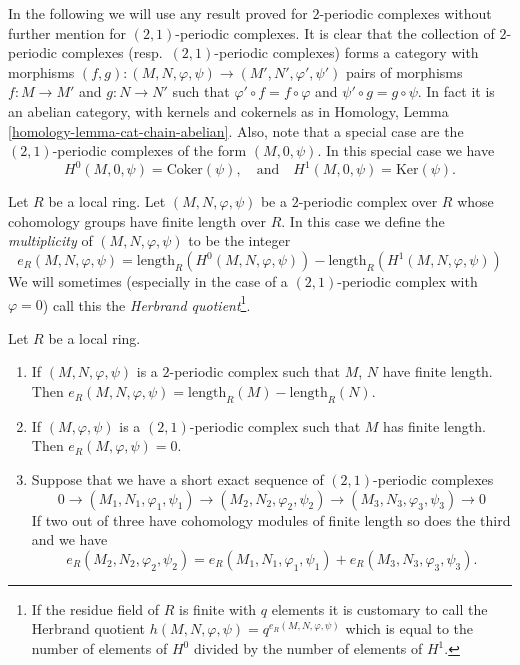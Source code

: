 \noindent
In the following we will use any result proved for $2$-periodic
complexes without further mention for $(2, 1)$-periodic complexes.
It is clear that the collection of $2$-periodic complexes
(resp.\ $(2, 1)$-periodic complexes) forms a category with morphisms
$(f, g) : (M, N, \varphi, \psi) \to (M', N', \varphi', \psi')$
pairs of morphisms $f : M \to M'$ and $g : N \to N'$ such
that $\varphi' \circ f = f \circ \varphi$ and $\psi' \circ g = g \circ \psi$.
In fact it is an abelian category, with kernels and cokernels as in
Homology, Lemma \ref{homology-lemma-cat-chain-abelian}.
Also, note that a special case are the
$(2, 1)$-periodic complexes of the form $(M, 0, \psi)$. In this
special case we have
$$
H^0(M, 0, \psi) = \text{Coker}(\psi)
,\quad\text{and}\quad
H^1(M, 0, \psi) = \text{Ker}(\psi).
$$

\begin{definition}
\label{definition-periodic-length}
Let $R$ be a local ring.
Let $(M, N, \varphi, \psi)$ be a $2$-periodic complex over $R$
whose cohomology groups have finite length over $R$.
In this case we define the {\it multiplicity} of $(M, N, \varphi, \psi)$
to be the integer
$$
e_R(M, N, \varphi, \psi) = 
\text{length}_R(H^0(M, N, \varphi, \psi))
-
\text{length}_R(H^1(M, N, \varphi, \psi))
$$
We will sometimes (especially in the case of a $(2, 1)$-periodic complex with
$\varphi = 0$) call this the {\it Herbrand quotient}\footnote{If the residue
field of $R$ is finite with $q$ elements
it is customary to call the Herbrand quotient
$h(M, N, \varphi, \psi) = q^{e_R(M, N, \varphi, \psi)}$ which is equal to
the number of elements of $H^0$ divided by the number of elements of
$H^1$.}.
\end{definition}

\begin{lemma}
\label{lemma-periodic-length}
Let $R$ be a local ring.
\begin{enumerate}
\item If $(M, N, \varphi, \psi)$ is a $2$-periodic complex
such that $M$, $N$ have finite length. Then
$e_R(M, N, \varphi, \psi) = \text{length}_R(M) - \text{length}_R(N)$.
\item If $(M, \varphi, \psi)$ is a $(2, 1)$-periodic complex
such that $M$ has finite length. Then
$e_R(M, \varphi, \psi) = 0$.
\item Suppose that we have a short exact sequence of
$(2, 1)$-periodic complexes
$$
0 \to (M_1, N_1, \varphi_1, \psi_1)
\to (M_2, N_2, \varphi_2, \psi_2)
\to (M_3, N_3, \varphi_3, \psi_3)
\to 0
$$
If two out of three have cohomology modules of finite length so does
the third and we have
$$
e_R(M_2, N_2, \varphi_2, \psi_2) =
e_R(M_1, N_1, \varphi_1, \psi_1) +
e_R(M_3, N_3, \varphi_3, \psi_3).
$$
\end{enumerate}
\end{lemma}

